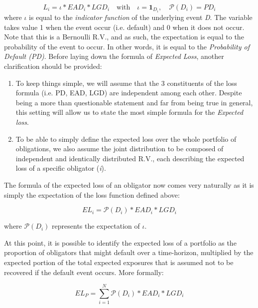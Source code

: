 \documentclass[a4paper,12pt]{article}
\begin{document}
    \begin{equation}
        L_{i}=\iota*EAD_{i}*LGD_{i} \quad\mathrm{with}\quad  \iota = \mathrm{\textbf{1}}_{D_{i}}, \quad\mathcal{P}(D_{i}) = PD_{i}
    \end{equation}
    where $\iota$ is equal to the \textit{indicator function} of the underlying event \textit{D}. The variable takes value 1 when the 
    event occur (i.e. default) and 0 when it does not occur. Note that this is a Bernoulli R.V., and as such, the expectation is equal to the probability of the event to occur. In other words, it is equal to the \textit{Probability of Default (PD)}. 
    Before laying down the formula of \textit{Expected Loss}, another clarification should be provided:
    
    \begin{enumerate}
        \item To keep things simple, we will assume that the 3 constituents of the loss formula (i.e. PD, EAD, LGD) are independent among each other. Despite being a more than questionable statement and far from being true in general, this setting will allow us to state the most simple formula for the \textit{Expected loss}.
        \item To be able to simply define the expected loss over the whole portfolio of obligations, we also assume the joint distribution to be composed of independent and identically distributed R.V., each describing the expected loss of a specific obligator (\textit{i}).
    \end{enumerate}

    The formula of the expected loss of an obligator now comes very naturally as it is simply the expectation of the loss function defined above:

        \begin{equation}
            EL_{i}=\mathcal{P}(D_{i})*EAD_{i}*LGD_{i}
        \end{equation}
    
    where $\mathcal{P}(D_{i})$ represents the expectation of $\iota$.

    At this point, it is possible to identify the expected loss of a portfolio as the proportion of obligators that might default over a time-horizon,
    multiplied by the expected portion of the total expected exposures that is assumed not to be recovered if the default event occurs. More formally:

        \begin{equation}
            EL_{P}=\sum_{i=1}^{N} \mathcal{P}(D_{i})*EAD_{i}*LGD_{i}
        \end{equation}
\end{document}
